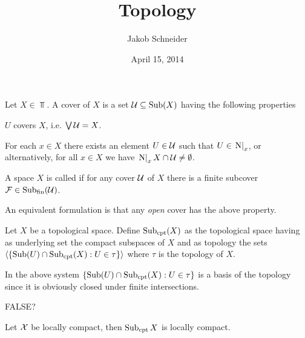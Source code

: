 \documentclass[a4paper,twoside]{article}%
\title{Topology}
\author{Jakob Schneider}
\date{April 15, 2014}
\begin{document}
\pagestyle{plain}
\maketitle

\clearpage
\tableofcontents
\pagestyle{headings}
\clearpage

\begin{definition}
    Let $X\in\Top$. A cover of $X$ is a set $\mathcal{U}\subseteq\mathop{\mathrm{Sub}}\nolimits(X)$ having the following properties
    \begin{properties}
            \item $U$ covers $X$, i.e. $\mathop\mathrm{\bigvee}\mathcal{U}=X$.
            \item For each $x\in X$ there exists an element $U\in\mathcal{U}$ such that $U\in\left. \mathrm{N}\right\vert_x$, or alternatively, for all $x\in X$ we have $\left. \mathrm{N}\right\vert_x X\cap \mathcal{U}\neq\emptyset$.%
    \end{properties}
\end{definition}

\begin{definition}%
    A space $X$ is called  if for any cover $\mathcal{U}$ of $X$ there is a finite subcover $\mathcal{F}\in\mathop{\mathrm{Sub}}\nolimits_{\mathrm{fin}}(\mathcal{U})$.
\end{definition}

\begin{remark}%
    An equivalent formulation is that any \emph{open} cover has the above property.
\end{remark}

\begin{definition}
    Let $X$ be a topological space. Define $\mathop{\mathrm{Sub}}\nolimits_{\mathop\mathrm{cpt}}(X)$ as the topological space having as underlying set the compact subspaces of $X$ and as topology the sets $\gen{\set{\Sub(U)\setmeet\Sub_{\cpt}(X)}[U\in\tau]}$ where $\tau$ is the topology of $X$.
\end{definition}

\begin{remark}
    In the above system $\set{\Sub(U)\setmeet\Sub_{\cpt}(X)}[U\in\tau]$ is a basis of the topology since it is obviously closed under finite intersections.
\end{remark}

FALSE?
\begin{lemma}
    Let $\mathcal{X}$ be locally compact, then $\mathop{\mathrm{Sub}}\nolimits_{\mathop\mathrm{cpt}}{X}$ is locally compact.
\end{lemma}
\end{document}
